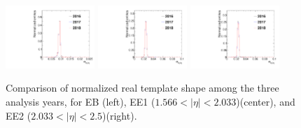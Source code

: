 \begin{figure}[!htbp]
\centering
\includegraphics[width=0.3\textwidth]{fig/sieie_comparison_EB_diphoton_fake_rate_real_templates_all_GGJets_GJets_pt130To150_chIso5To10.pdf}
\includegraphics[width=0.3\textwidth]{fig/sieie_comparison_EE1_diphoton_fake_rate_real_templates_all_GGJets_GJets_pt130To150_chIso5To10.pdf}
\includegraphics[width=0.3\textwidth]{fig/sieie_comparison_EE2_diphoton_fake_rate_real_templates_all_GGJets_GJets_pt130To150_chIso5To10.pdf}
\caption{Comparison of normalized real template shape among the three analysis years, for EB (left), EE1 ($1.566 < |\eta| < 2.033$)(center), and EE2 ($2.033 < \lvert \eta \rvert< 2.5$)(right).}
\label{fig:real_templates_by_year}
\end{figure}

